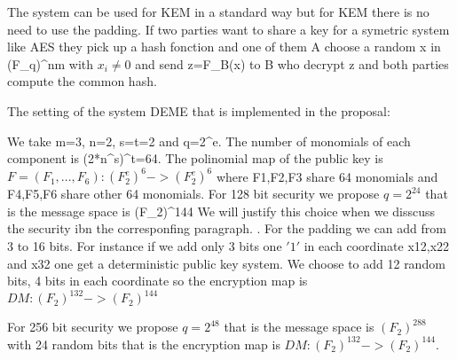 \documentclass[12pt,a4paper]{amsart}
\theoremstyle{remark}
\theoremstyle{definition}
\begin{document}
The system can be used for KEM in a standard way but for KEM there is no need to use the padding. 
If two parties want to share a key for a symetric system like AES they pick up  a hash fonction and 
one of them A choose a random x in (F_q)^nm with $x_i \neq 0$ and send z=F_B(x) to B who decrypt z and both parties compute the common hash.


The setting of the system DEME that is implemented in the proposal:

We take m=3, n=2, s=t=2 and q=2^e. The number of monomials of each component is (2*n^s)^t=64.
The polinomial map of the public key is $F=(F_1,...,F_6): (F_2^e)^6 -> (F_2^e)^6 $ where F1,F2,F3 share
64 monomials and F4,F5,F6 share other 64 monomials. 
For 128 bit security we propose $q=2^24$ that is the message space is (F_2)^144 We will justify this choice when we disscuss the security ibn the corresponfing paragraph. . For the padding we can add from 3 to 16 bits. For instance if we add only 3 bits one $'1'$ in each coordinate x12,x22 and x32 one get a deterministic public key system. 
We choose to add 12 random bits, 4 bits in each coordinate so the encryption map is $DM: (F_2)^132 -> (F_2)^144$

For 256 bit security we propose $q=2^48$ that is the message space is $(F_2)^288$ with 24 random bits that is the  encryption map is $DM: (F_2)^132 -> (F_2)^144.$
\end{document}
